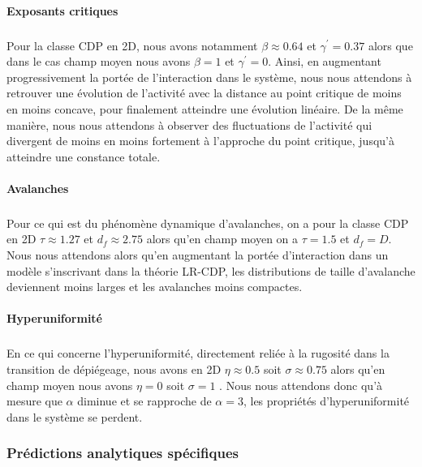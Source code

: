 \paragraph{Exposants critiques}

\subparagraph{}Pour la classe CDP en 2D, nous avons notamment $\beta\approx 0.64$ et $\gamma^\prime = 0.37$ alors que dans le cas champ moyen nous avons $\beta=1$ et $\gamma^\prime = 0$. Ainsi, en augmentant progressivement la portée de l'interaction dans le système, nous nous attendons à retrouver une évolution de l'activité avec la distance au point critique de moins en moins concave, pour finalement atteindre une évolution linéaire. De la même manière, nous nous attendons à observer des fluctuations de l'activité qui divergent de moins en moins fortement à l'approche du point critique, jusqu'à atteindre une constance totale.

\paragraph{Avalanches}

\subparagraph{}Pour ce qui est du phénomène dynamique d'avalanches, on a pour la classe CDP en 2D $\tau\approx 1.27$ et $d_f\approx 2.75$ \cite{chessa_universality_1999, lubeck_universal_2004, chessa_critical_1999, wiese_theory_2022, rosso_depinning_2003} alors qu'en champ moyen on a $\tau = 1.5$ et $d_f=D$. Nous nous attendons alors qu'en augmentant la portée d'interaction dans un modèle s'inscrivant dans la théorie LR-CDP, les distributions de taille d'avalanche deviennent moins larges et les avalanches moins compactes.

\paragraph{Hyperuniformité}

\subparagraph{}En ce qui concerne l'hyperuniformité, directement reliée à la rugosité dans la transition de dépiégeage, nous avons en 2D $\eta \approx 0.5$ soit $\sigma \approx 0.75$ alors qu'en champ moyen nous avons $\eta = 0$ soit $\sigma = 1$ \cite{wiese_theory_2022}. Nous nous attendons donc qu'à mesure que $\alpha$ diminue et se rapproche de $\alpha=3$, les propriétés d'hyperuniformité dans le système se perdent.

\subsubsection{Prédictions analytiques spécifiques}

